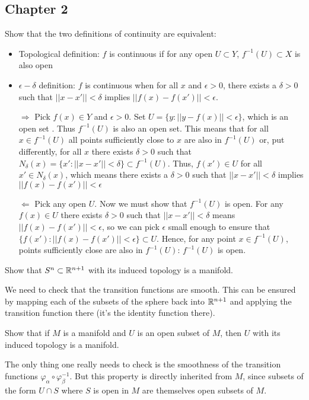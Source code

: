 
\subsection{Chapter 2}

\begin{p}
Show that the two definitions of continuity are equivalent: 
 \begin{itemize}
\item Topological definition: $f$ is continuous if for any open $U\subset Y$, $f^{-1}(U)\subset X$ is also open
 \item $\epsilon-\delta$ definition: $f$ is continuous when for all $x$ and $\epsilon>0$, there exists a $\delta>0$ such that $||x-x'||<\delta$ implies $||f(x)-f(x')||<\epsilon$. 
\end{itemize}
\end{p}
{
 \begin{itemize}
\item[$\Rightarrow$] Pick $f(x)\in Y$ and $\epsilon>0$. Set $U=\{y:||y-f(x)||<\epsilon\}$, which is an open set . Thus $f^{-1}(U)$ is also an open set. This means that for all $x\in f^{-1}(U)$ all points sufficiently close to $x$ are also in $f^{-1}(U)$ or, put differently, for all $x$ there exists $\delta>0$ such that $N_\delta(x)=\{x':||x-x'||<\delta\}\subset f^{-1}(U)$. Thus, $f(x')\in U$ for all $x'\in N_\delta(x)$, which means there exists a $\delta>0$ such that $||x-x'||<\delta$ implies $||f(x)-f(x')||<\epsilon$

 \item[$\Leftarrow$] Pick any open $U$. Now we must show that $f^{-1}(U)$ is open. For any $f(x)\in U$ there exists $\delta>0$ such that $||x-x'||<\delta$ means $||f(x)-f(x')||<\epsilon$, so we can pick $\epsilon$ small enough to ensure that $\{f(x'):||f(x)-f(x')||<\epsilon\}\subset U$. Hence, for any point $x\in f^{-1}(U)$, points sufficiently close are also in $f^{-1}(U)$: $f^{-1}(U)$ is open. 
\end{itemize}
}

\begin{p}
Show that $S^n\subset \mathbb{R}^{n+1}$ with its induced topology is a manifold.
\end{p}
We need to check that the transition functions are smooth. This can be ensured by 
mapping each of the subsets of the sphere back into $\mathbb{R}^{n+1}$ and
applying the transition function there (it's the identity function there).


\begin{p}
Show that if $M$ is a manifold and $U$ is an open subset of $M$, then $U$ with its 
induced topology is a manifold.
\end{p}
{
The only thing one really needs to check is the smoothness of the transition functions
$\varphi_\alpha \circ \varphi_\beta^{-1}$. But this property is directly inherited from $M$,
since subsets of the form $U \cap S$ where $S$ is open in $M$ are themselves open
subsets of $M$.
}

